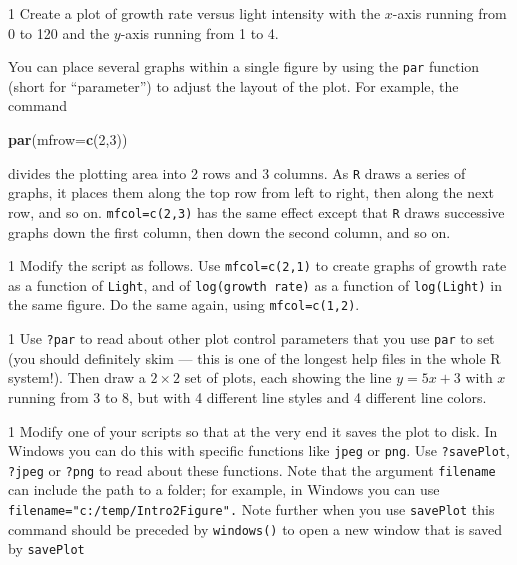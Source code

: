 \documentclass[11pt,]{article}
\newenvironment{Shaded}{\begin{snugshade}}{\end{snugshade}}
\newcommand{\DataTypeTok}[1]{\textcolor[rgb]{0.13,0.29,0.53}{#1}}
\newcommand{\DecValTok}[1]{\textcolor[rgb]{0.00,0.00,0.81}{#1}}
\newcommand{\KeywordTok}[1]{\textcolor[rgb]{0.13,0.29,0.53}{\textbf{#1}}}
\newcommand{\NormalTok}[1]{#1}
\let\BeginKnitrBlock\begin \let\EndKnitrBlock\end
\begin{document}
\BeginKnitrBlock{exercisebox}{1}
Create a plot of growth rate versus light intensity with the \(x\)-axis running from 0 to 120 and the \(y\)-axis running from 1 to 4.
\EndKnitrBlock{exercisebox}

You can place several graphs within a single figure by using the \texttt{par} function (short for ``parameter'') to adjust the layout of the plot. For example, the command

\begin{Shaded}
\begin{Highlighting}[]
\KeywordTok{par}\NormalTok{(}\DataTypeTok{mfrow=}\KeywordTok{c}\NormalTok{(}\DecValTok{2}\NormalTok{,}\DecValTok{3}\NormalTok{))}
\end{Highlighting}
\end{Shaded}

divides the plotting area into 2 rows and 3 columns. As \texttt{R} draws a series of graphs, it places them along the top row from left to right, then along the next row, and so on. \texttt{mfcol=c(2,3)} has the same effect except that \texttt{R} draws successive graphs down the first column, then down the second column, and so on.

\BeginKnitrBlock{exercisebox}{1}
Modify the script as follows. Use \texttt{mfcol=c(2,1)} to create graphs of growth rate as a function of \texttt{Light}, and of \texttt{log(growth\ rate)} as a function of \texttt{log(Light)} in the same figure. Do the same again, using \texttt{mfcol=c(1,2)}.
\EndKnitrBlock{exercisebox}

\BeginKnitrBlock{exercisebox}{1}
Use \texttt{?par} to read about other plot control parameters that you use \texttt{par} to set (you should definitely skim --- this is one of the longest help files in the whole R system!). Then draw a \(2 \times 2\) set of plots, each showing the line \(y=5x+3\) with \(x\) running from 3 to 8, but with 4 different line styles and 4 different line colors.
\EndKnitrBlock{exercisebox}

\BeginKnitrBlock{exercisebox}{1}
Modify one of your scripts so that at the very end it saves the plot to disk. In Windows you can do this with specific functions like \texttt{jpeg} or \texttt{png}. Use \texttt{?savePlot}, \texttt{?jpeg} or \texttt{?png} to read about these functions. Note that the argument \texttt{filename} can include the path to a folder; for example, in Windows you can use \texttt{filename="c:/temp/Intro2Figure".} Note further when you use \texttt{savePlot} this command should be preceded by \texttt{windows()} to open a new window that is saved by \texttt{savePlot}
\EndKnitrBlock{exercisebox}
\end{document}
